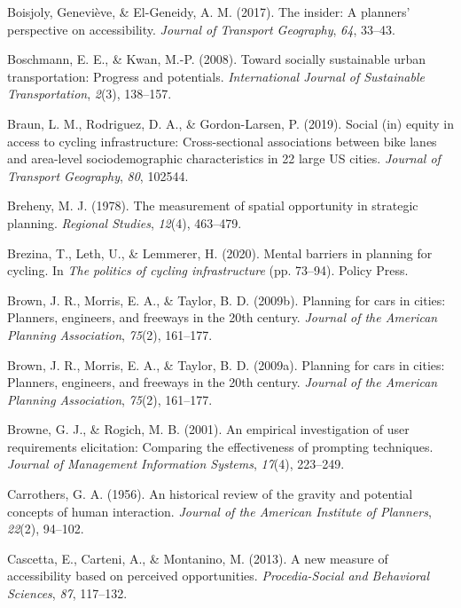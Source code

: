 \documentclass[
11pt, %
oneside, %
english, %
singlespacing, %
]{macthesis} %
\newlength{\cslhangindent}
\newenvironment{CSLReferences}[2] %
{\begin{list}{}{%
	\setlength{\itemindent}{0pt}
	\setlength{\leftmargin}{0pt}
	\setlength{\parsep}{0pt}
	\ifodd #1
	\setlength{\leftmargin}{\cslhangindent}
	\setlength{\itemindent}{-1\cslhangindent}
	\fi
	\setlength{\itemsep}{#2\baselineskip}}}
{\end{list}}
\begin{document}
\begin{CSLReferences}{1}{0}
Boisjoly, Geneviève, \& El-Geneidy, A. M. (2017). The insider: A planners' perspective on accessibility. \emph{Journal of Transport Geography}, \emph{64}, 33--43.

Boschmann, E. E., \& Kwan, M.-P. (2008). Toward socially sustainable urban transportation: Progress and potentials. \emph{International Journal of Sustainable Transportation}, \emph{2}(3), 138--157.

Braun, L. M., Rodriguez, D. A., \& Gordon-Larsen, P. (2019). Social (in) equity in access to cycling infrastructure: Cross-sectional associations between bike lanes and area-level sociodemographic characteristics in 22 large US cities. \emph{Journal of Transport Geography}, \emph{80}, 102544.

Breheny, M. J. (1978). The measurement of spatial opportunity in strategic planning. \emph{Regional Studies}, \emph{12}(4), 463--479.

Brezina, T., Leth, U., \& Lemmerer, H. (2020). Mental barriers in planning for cycling. In \emph{The politics of cycling infrastructure} (pp. 73--94). Policy Press.

Brown, J. R., Morris, E. A., \& Taylor, B. D. (2009b). Planning for cars in cities: Planners, engineers, and freeways in the 20th century. \emph{Journal of the American Planning Association}, \emph{75}(2), 161--177.

Brown, J. R., Morris, E. A., \& Taylor, B. D. (2009a). Planning for cars in cities: Planners, engineers, and freeways in the 20th century. \emph{Journal of the American Planning Association}, \emph{75}(2), 161--177.

Browne, G. J., \& Rogich, M. B. (2001). An empirical investigation of user requirements elicitation: Comparing the effectiveness of prompting techniques. \emph{Journal of Management Information Systems}, \emph{17}(4), 223--249.

Carrothers, G. A. (1956). An historical review of the gravity and potential concepts of human interaction. \emph{Journal of the American Institute of Planners}, \emph{22}(2), 94--102.

Cascetta, E., Carteni, A., \& Montanino, M. (2013). A new measure of accessibility based on perceived opportunities. \emph{Procedia-Social and Behavioral Sciences}, \emph{87}, 117--132.


\end{CSLReferences}
\end{document}
